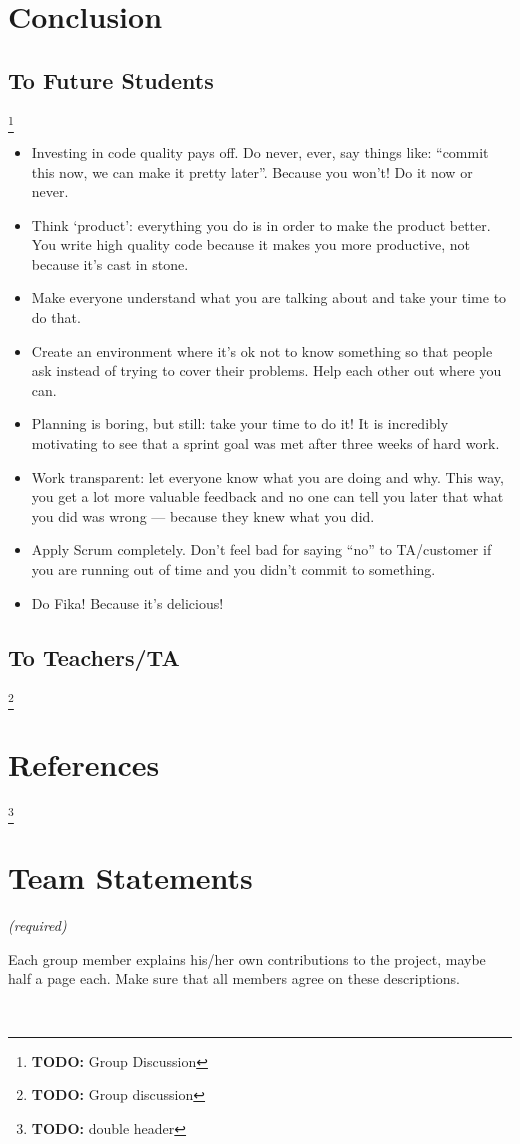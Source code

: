 \documentclass[11pt,a4paper]{report}
\newcommand{\hi}[1]{{\color{red}\tiny \em #1\/}\\}
\newcommand{\todo}[1]{\footnote{{\color{red} {\bf TODO:} #1}}}
\begin{document}
\chapter{Conclusion}
\section*{To Future Students}
\todo{Group Discussion}
\begin{itemize}
\item  Investing in code quality pays off. Do never, ever, say things like:
``commit this now, we can make it pretty later''. Because you won't!
Do it now or never.
\item Think `product': everything you do is in order to make the product better.
You write high quality code because it makes you more productive, not because
it's cast in stone.
\item Make everyone understand what you are talking about and take your time to
do that.
\item Create an environment where it's ok not to know something so that people
ask instead of trying to cover their problems. Help each other out where you
can.
\item Planning is boring, but still: take your time to do it! It is incredibly
motivating to see that a sprint goal was met after three weeks of hard work.
\item Work transparent: let everyone know what you are doing and why. This way,
you get a lot more valuable feedback and no one can tell you later that what you
did was wrong --- because they knew what you did.
\item Apply Scrum completely. Don't feel bad for saying ``no'' to TA/customer if
you are running out of time and you didn't commit to something.
\item Do Fika! Because it's delicious!
\end{itemize}
\section*{To Teachers/TA}
\todo{Group discussion}

\chapter{References}

\appendix
\todo{double header}

\chapter{Team Statements}
\hi{ (required)

Each group member explains his/her own contributions to the project, maybe half a page each. Make sure that all members agree on these descriptions.}
\end{document}
